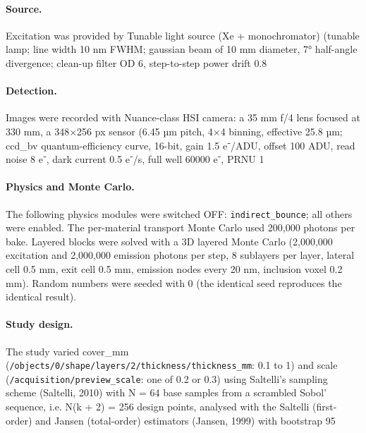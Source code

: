 \paragraph{Source.} Excitation was provided by Tunable light source (Xe + monochromator) (tunable lamp; line width 10 nm FWHM; gaussian beam of 10 mm diameter, 7° half-angle divergence; clean-up filter OD 6, step-to-step power drift 0.8 %

\paragraph{Detection.} Images were recorded with Nuance-class HSI camera: a 35 mm f/4 lens focused at 330 mm, a 348×256 px sensor (6.45 µm pitch, 4×4 binning, effective 25.8 µm; ccd_bv quantum-efficiency curve, 16-bit, gain 1.5 e⁻/ADU, offset 100 ADU, read noise 8 e⁻, dark current 0.5 e⁻/s, full well 60000 e⁻, PRNU 1 %

\paragraph{Physics and Monte Carlo.} The following physics modules were switched OFF: \texttt{indirect\_bounce}; all others were enabled. The per-material transport Monte Carlo used 200,000 photons per bake. Layered blocks were solved with a 3D layered Monte Carlo (2,000,000 excitation and 2,000,000 emission photons per step, 8 sublayers per layer, lateral cell 0.5 mm, exit cell 0.5 mm, emission nodes every 20 nm, inclusion voxel 0.2 mm). Random numbers were seeded with 0 (the identical seed reproduces the identical result).

\paragraph{Study design.} The study varied cover\_mm (\texttt{/objects/0/shape/layers/2/thickness/thickness\_mm}: 0.1 to 1) and scale (\texttt{/acquisition/preview\_scale}: one of 0.2 or 0.3) using Saltelli's sampling scheme (Saltelli, 2010) with N = 64 base samples from a scrambled Sobol' sequence, i.e. N(k + 2) = 256 design points, analysed with the Saltelli (first-order) and Jansen (total-order) estimators (Jansen, 1999) with bootstrap 95 %

